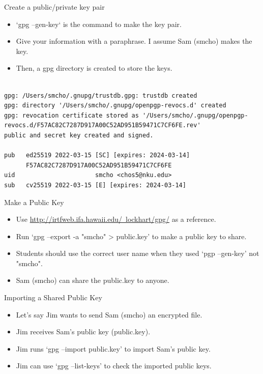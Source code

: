 \begin{frame}[fragile]{Create a public/private key pair}

\begin{itemize}
	\item `gpg --gen-key` is the command to make the key pair.
	\item Give your information with a paraphrase. I assume Sam (smcho) makes the key. 
	\item Then, a gpg directory is created to store the keys. 
\end{itemize}

\begin{Command}{}
\begin{lstlisting}[firstnumber=1, label=glabels, xleftmargin=0pt, basicstyle=\tiny]% 

gpg: /Users/smcho/.gnupg/trustdb.gpg: trustdb created
gpg: directory '/Users/smcho/.gnupg/openpgp-revocs.d' created
gpg: revocation certificate stored as '/Users/smcho/.gnupg/openpgp-revocs.d/F57AC82C7287D917A00C52AD951B59471C7CF6FE.rev'
public and secret key created and signed.

pub   ed25519 2022-03-15 [SC] [expires: 2024-03-14]
      F57AC82C7287D917A00C52AD951B59471C7CF6FE
uid                      smcho <chos5@nku.edu>
sub   cv25519 2022-03-15 [E] [expires: 2024-03-14]
\end{lstlisting}%
\end{Command}
\end{frame}

\begin{frame}[fragile]{Make a Public Key}

\begin{itemize}
    \item Use \href{http://irtfweb.ifa.hawaii.edu/~lockhart/gpg/}{http://irtfweb.ifa.hawaii.edu/~lockhart/gpg/} as a reference. 
	\item Run `gpg --export -a "smcho" > public.key' to make a public key to share. 
	\item Students should use the correct user name when they used `pgp --gen-key' not "smcho". 
	\item Sam (smcho) can share the public.key to anyone. 
\end{itemize}

\end{frame}

\begin{frame}[fragile]{Importing a Shared Public Key}

\begin{itemize}
    \item Let's say Jim wants to send Sam (smcho) an encrypted file. 
    \item Jim receives Sam's public key (public.key). 
    \item Jim runs `gpg --import public.key' to import Sam's public key. 
    \item Jim can use `gpg --list-keys' to check the imported public keys. 
\end{itemize}

\end{frame}

